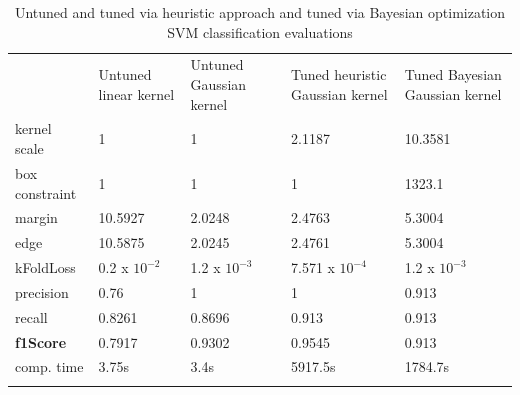 \begin{table}[!ht]
	\centering
\caption{Untuned and tuned via heuristic approach and tuned via Bayesian optimization SVM classification evaluations}
\label{tab:stuck}       %
\begin{tabular}{p{2.7cm}p{2.0cm}p{2.3cm}p{3cm}p{3cm}}
\hline\noalign{\smallskip}
 & Untuned linear kernel & Untuned Gaussian kernel & Tuned heuristic Gaussian kernel & Tuned Bayesian Gaussian kernel\\
\noalign{\smallskip}\hline\noalign{\smallskip}
kernel scale & 1 & 1 & 2.1187 & 10.3581 \\
box constraint & 1 & 1 & 1 & 1323.1 \\
margin & 10.5927 & 2.0248 & 2.4763 & 5.3004 \\
edge & 10.5875 & 2.0245 & 2.4761 & 5.3004 \\
kFoldLoss & 0.2 x $10^{-2}$ & 1.2 x $10^{-3}$& 7.571 x $10^{-4}$ & 1.2 x $10^{-3}$ \\
precision & 0.76 & 1 & 1 & 0.913 \\
recall & 0.8261 & 0.8696 & 0.913 & 0.913\\
\textbf{f1Score} & 0.7917 & 0.9302 &0.9545 & 0.913 \\
comp. time & 3.75s & 3.4s & 5917.5s & 1784.7s \\
\noalign{\smallskip}\hline
\end{tabular}
\end{table}




